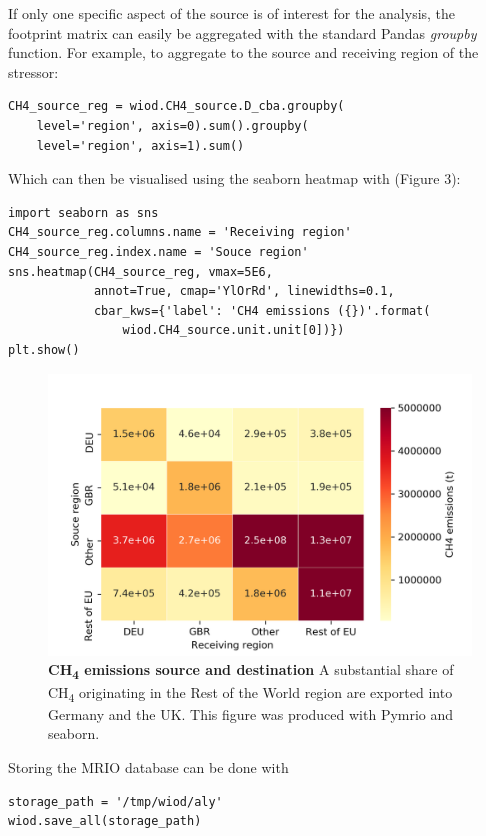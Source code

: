 \documentclass{jors}
\begin{document}
If only one specific aspect of the source is of interest for the analysis, the footprint matrix can easily be aggregated with the standard Pandas {\it groupby} function.
For example, to aggregate to the source and receiving region of the stressor:

\begin{lstlisting}
CH4_source_reg = wiod.CH4_source.D_cba.groupby(
    level='region', axis=0).sum().groupby(
    level='region', axis=1).sum()
\end{lstlisting}

Which can then be visualised using the seaborn heatmap \cite{waskom2017} with (Figure 3):

\begin{lstlisting}
import seaborn as sns
CH4_source_reg.columns.name = 'Receiving region'
CH4_source_reg.index.name = 'Souce region'
sns.heatmap(CH4_source_reg, vmax=5E6, 
            annot=True, cmap='YlOrRd', linewidths=0.1,
            cbar_kws={'label': 'CH4 emissions ({})'.format(
                wiod.CH4_source.unit.unit[0])})
plt.show()
\end{lstlisting}

  \begin{figure}[h!]
      \includegraphics[width=.9\textwidth]{./fig/airch4_source_reg.png}
      \caption{\textbf{CH\textsubscript{4} emissions source and destination}
      A substantial share of CH\textsubscript{4} originating in the Rest of the World region are exported into Germany and the UK.
      This figure was produced with Pymrio and seaborn. }
      \end{figure}


Storing the MRIO database can be done with 

\begin{lstlisting}
storage_path = '/tmp/wiod/aly'
wiod.save_all(storage_path)
\end{lstlisting}
\end{document}
